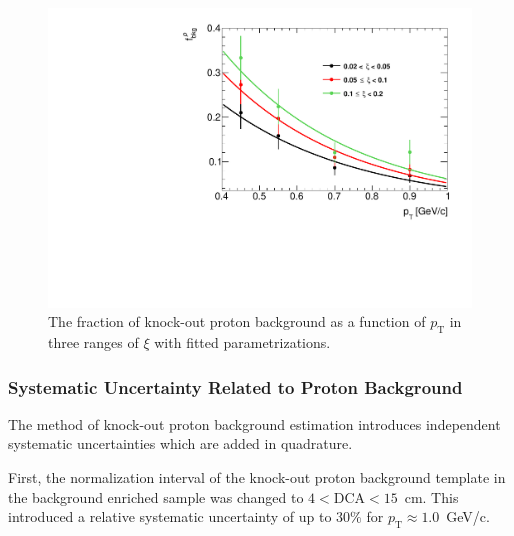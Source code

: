  \begin{figure}[h!]%
 	\centering
 	\includegraphics[width=0.8\linewidth, page=1]{chapters/chrgSTAR/img/DCAproton/bkg_p.pdf}
 	\caption{The fraction of knock-out proton background  as a function of $p_\textrm{T}$ in three ranges of $\xi$  with  fitted parametrizations.}
 	\label{fig:bkg_proton_fit}
 \end{figure}
 
 \subsubsection{Systematic Uncertainty Related to Proton Background} 
The method of   knock-out proton background estimation  introduces independent systematic uncertainties which are added in quadrature. 

First, the normalization interval of the  knock-out   proton  background template in the background enriched sample was changed to $4<\textrm{DCA}<15$~cm. This introduced a relative systematic uncertainty of up to $30\%$ for $p_\textrm{T}\approx 1.0$~GeV/c. 

